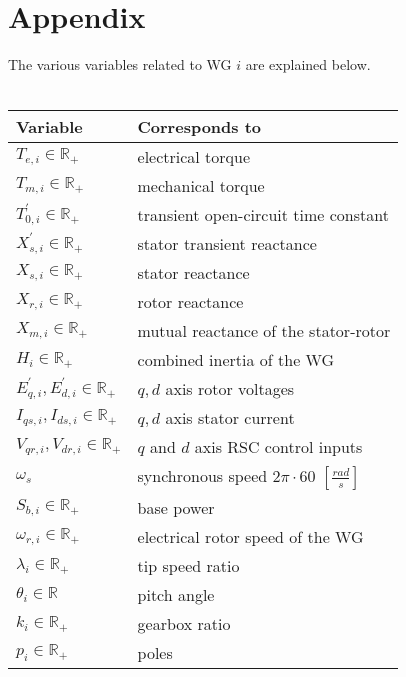 \documentclass[letterpaper, 10 pt, conference]{ieeeconf}
\begin{document}
\section{Appendix}
The various variables related to WG $i$ are explained below.\\\\
 \begin{tabular}{| l | l | }
\hline
\textbf{Variable} & \textbf{Corresponds to} \\\hline
 $T_{e,i}\in \mathbb{R}_{+}$ & electrical torque \\\hline
 $T_{m,i}\in \mathbb{R}_{+}$ &  mechanical torque \\\hline
 $T_{0,i}^'\in \mathbb{R}_{+}$ & transient open-circuit time constant\\\hline
 $X_{s,i}^'\in \mathbb{R}_{+}$ &  stator transient reactance\\\hline
 $X_{s,i}\in \mathbb{R}_{+}$ &  stator reactance \\\hline
 $X_{r,i}\in \mathbb{R}_{+}$ & rotor reactance\\\hline
 $X_{m,i}\in \mathbb{R}_{+}$ & mutual reactance of the stator-rotor\\\hline
 $H_i\in \mathbb{R}_{+}$ & combined inertia of the WG\\\hline
 $E_{q,i}^',E_{d,i}^'\in \mathbb{R}_{+}$ &  $q,d$ axis rotor voltages\\ 
 \hline
 $I_{qs,i},I_{ds,i}\in \mathbb{R}_{+}$ & $q,d$ axis stator current \\ \hline
   $V_{qr,i},V_{dr,i}\in \mathbb{R}_{+}$ &  $q$ and $d$ axis RSC control inputs \\\hline
  $\omega_s$ & synchronous speed $2\pi\cdot 60$ $[\frac{rad}{s}]$\\\hline
  $S_{b,i}\in \mathbb{R}_{+}$ & base power \\\hline
  $\omega_{r,i}\in \mathbb{R}_{+}$&  electrical rotor speed of the WG \\\hline
  $\lambda_i\in \mathbb{R}_{+}$ & tip speed ratio\\\hline
  $\theta_i\in \mathbb{R}$ &  pitch angle\\\hline
 $k_i\in \mathbb{R}_{+}$ &  gearbox ratio\\\hline
 $p_i\in \mathbb{R}_{+}$ &  poles\\\hline
 \end{tabular}
 
\end{document}
